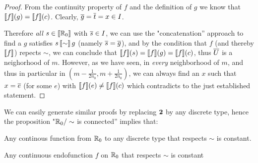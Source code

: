 \begin{proof}
From the continuity property of $f$ and the definition of
$g$ we know that $\llbracket f\rrbracket (g) = \llbracket f\rrbracket(c)$. Clearly, $\overline{g} =
\overline{t} = x \in I$. 

Therefore \emph{all} $s \in \llbracket \mathbb{R}_0\rrbracket$ with $\overline{s} \in I$, we can use the "concatenation'' approach to find a $g$
satisfies $s \, \llbracket \sim\rrbracket \,  g$ (namely $\overline{s} = \overline{g}$), and by the condition that $f$ (and
thereby $\llbracket f\rrbracket$) repects $\sim$, we can conclude that $\llbracket f\rrbracket
(s) = \llbracket f\rrbracket (g) = \llbracket f\rrbracket(c)$, thus $\overline{U}$ is a neighorhood of $m$.
However, as we have seen, in \emph{every} neighborhood of $m$, and thus in particular in $(m - \frac 1 {2n_0} , m+ \frac 1 {2n_0})$, we can always find an $x$ such that $x = \overline{e}$ (for some $e$) with $\llbracket f\rrbracket(e) \not= \llbracket f\rrbracket(c)$ which contradicts to the just established statement.
\end{proof}



We can easily generate similar proofs by replacing $\mathbf{2}$ by any discrete type, hence the proposition "$\mathbb{R}_0 / \sim$ is connected'' implies that:

\begin{corollary}\label{dis:con}
Any continous function from $\mathbb{R}_0$ to any discrete type that respects $\sim$ is constant.
\end{corollary}



\begin{theorem}
Any continuous endofunction $f$ on $\mathbb{R}_0$ that respects $\sim$ is constant
\end{theorem}

